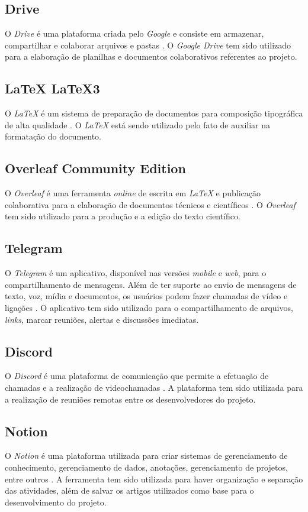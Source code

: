 \subsection{Drive}
O \textit{Drive} é uma plataforma criada pelo \textit{Google} e consiste em armazenar, compartilhar e colaborar arquivos e pastas \cite{drive}. O \textit{Google Drive} tem sido utilizado para a elaboração de planilhas e documentos colaborativos referentes ao projeto.

\subsection{LaTeX LaTeX3}
O \textit{LaTeX} é um sistema de preparação de documentos para composição tipográfica de alta qualidade \cite{latex}. O \textit{LaTeX} está sendo utilizado pelo fato de auxiliar na formatação do documento.

\subsection{Overleaf Community Edition}
O \textit{Overleaf} é uma ferramenta \textit{online} de escrita em \textit{LaTeX} e publicação colaborativa para a elaboração de documentos técnicos e científicos \cite{overleaf}. O \textit{Overleaf} tem sido utilizado para a produção e a edição do texto científico.

\subsection{Telegram}
O \textit{Telegram} é um aplicativo, disponível nas versões \textit{mobile} e \textit{web}, para o compartilhamento de mensagens. Além de ter suporte ao envio de mensagens de texto, voz, mídia e documentos, os usuários podem fazer chamadas de vídeo e ligações \cite{telegram}. O aplicativo tem sido utilizado para o compartilhamento de arquivos, \textit{links}, marcar reuniões, alertas e discussões imediatas.

\subsection{Discord}
O \textit{Discord} é uma plataforma de comunicação que permite a efetuação de chamadas e a realização de videochamadas \cite{discord}. A plataforma tem sido utilizada para a realização de reuniões remotas entre os desenvolvedores do projeto.

\subsection{Notion}
O \textit{Notion} é uma plataforma utilizada para criar sistemas de gerenciamento de conhecimento, gerenciamento de dados, anotações, gerenciamento de projetos, entre outros \cite{notion}. A ferramenta tem sido utilizada para haver organização e separação das atividades, além de salvar os artigos utilizados como base para o desenvolvimento do projeto.